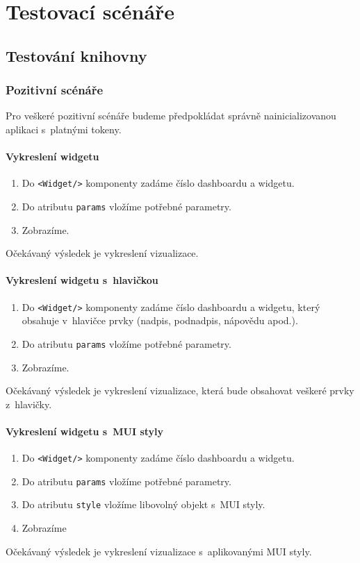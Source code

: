 \documentclass[czech, bc, kiv, he, iso690numb]{fasthesis}
\begin{document}
\chapter{Testovací scénáře}\label{app:testCases}
\section{Testování knihovny}
\subsection{Pozitivní scénáře}
Pro veškeré pozitivní scénáře budeme předpokládat správně nainicializovanou aplikaci s~platnými tokeny.
\subsubsection{Vykreslení widgetu}
\begin{enumerate}
	\item Do \texttt{<Widget/>} komponenty zadáme číslo dashboardu a widgetu.
	\item Do atributu \texttt{params} vložíme potřebné parametry.
	\item Zobrazíme.
\end{enumerate}
Očekávaný výsledek je vykreslení vizualizace.

\subsubsection{Vykreslení widgetu s~hlavičkou}
\begin{enumerate}
	\item Do \texttt{<Widget/>} komponenty zadáme číslo dashboardu a widgetu, který obsahuje v~hlavičce prvky (nadpis, podnadpis, nápovědu apod.).
	\item Do atributu \texttt{params} vložíme potřebné parametry.
	\item Zobrazíme.
\end{enumerate}
Očekávaný výsledek je vykreslení vizualizace, která bude obsahovat veškeré prvky z~hlavičky.

\subsubsection{Vykreslení widgetu s~MUI styly}
\begin{enumerate}
	\item Do \texttt{<Widget/>} komponenty zadáme číslo dashboardu a widgetu.
	\item Do atributu \texttt{params} vložíme potřebné parametry.
	\item Do atributu \texttt{style} vložíme libovolný objekt s~MUI styly.
	\item Zobrazíme
\end{enumerate}
Očekávaný výsledek je vykreslení vizualizace s~aplikovanými MUI styly.
\end{document}
